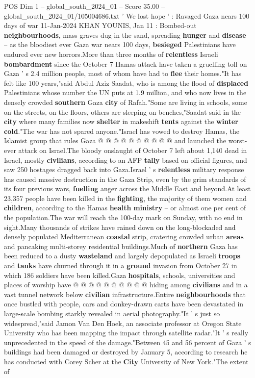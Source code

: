 \begin{textsample}{POS Dim 1 – global\_south\_2024\_01 – Score 35.00 – global\_south\_2024\_01/105004686.txt}  \label{ex:f1_pos_115}
' We lost hope ' : Ravaged Gaza nears 100 days of war 11-Jan-2024 KHAN YOUNIS, Jan 11 : Bombed-out \textbf{neighbourhoods}, mass graves dug in the sand, spreading \textbf{hunger} and \textbf{disease} -- as the bloodiest ever Gaza war nears 100 days, \textbf{besieged} Palestinians have endured ever new horrors.More than three months of \textbf{relentless} Israeli \textbf{bombardment} since the October 7 Hamas attack have taken a gruelling toll on Gaza ' s 2.4 million people, most of whom have had to \textbf{flee} their homes."It has felt like 100 years,"said Abdul Aziz Saadat, who is among the flood of \textbf{displaced} Palestinians whose number the UN puts at 1.9 million, and who now lives in the densely crowded \textbf{southern} Gaza \textbf{city} of Rafah."Some are living in schools, some on the streets, on the floors, others are sleeping on benches,"Saadat said in the \textbf{city} where many families now \textbf{shelter} in makeshift \textbf{tents} against the \textbf{winter} \textbf{cold}."The war has not spared anyone."Israel has vowed to destroy Hamas, the Islamist group that rules Gaza @ @ @ @ @ @ @ @ @ @ and launched the worst-ever attack on Israel.The bloody onslaught of October 7 left about 1,140 dead in Israel, mostly \textbf{civilians}, according to an AFP \textbf{tally} based on official figures, and saw 250 hostages dragged back into Gaza.Israel ' s \textbf{relentless} military response has caused massive destruction in the Gaza Strip, even by the grim standards of its four previous wars, \textbf{fuelling} anger across the Middle East and beyond.At least 23,357 people have been killed in the \textbf{fighting}, the majority of them women and \textbf{children}, according to the Hamas \textbf{health} \textbf{ministry} -- or almost one per cent of the population.The war will reach the 100-day mark on Sunday, with no end in sight.Many thousands of strikes have rained down on the long-blockaded and densely populated Mediterranean \textbf{coastal} strip, cratering crowded urban \textbf{areas} and pancaking multi-storey residential buildings.Much of \textbf{northern} Gaza has been reduced to a dusty \textbf{wasteland} and largely depopulated as Israeli \textbf{troops} and \textbf{tanks} have churned through it in a \textbf{ground} invasion from October 27 in which 186 soldiers have been killed.Gaza \textbf{hospitals}, schools, universities and places of worship have @ @ @ @ @ @ @ @ @ @ hiding among \textbf{civilians} and in a vast tunnel network below \textbf{civilian} infrastructure.Entire \textbf{neighbourhoods} that once bustled with people, cars and donkey-drawn carts have been devastated in large-scale bombing starkly revealed in aerial photography."It ' s just so widespread,"said Jamon Van Den Hoek, an associate professor at Oregon State University who has been mapping the impact through satellite radar."It ' s really unprecedented in the speed of the damage."Between 45 and 56 percent of Gaza ' s buildings had been damaged or destroyed by January 5, according to research he has conducted with Corey Scher at the \textbf{City} University of New York."The extent of 
\end{textsample}
